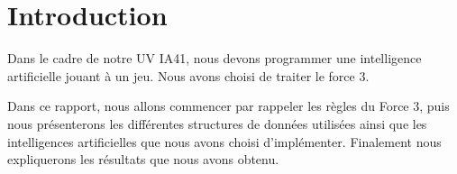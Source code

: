 \chapter{Introduction}

Dans le cadre de notre UV IA41, nous devons programmer une intelligence
artificielle jouant à un jeu. Nous avons choisi de traiter le force 3.

Dans ce rapport, nous allons commencer par rappeler les règles du Force 3, puis
nous présenterons les différentes structures de données utilisées ainsi que les
intelligences artificielles que nous avons choisi d'implémenter. Finalement nous
expliquerons les résultats que nous avons obtenu.

